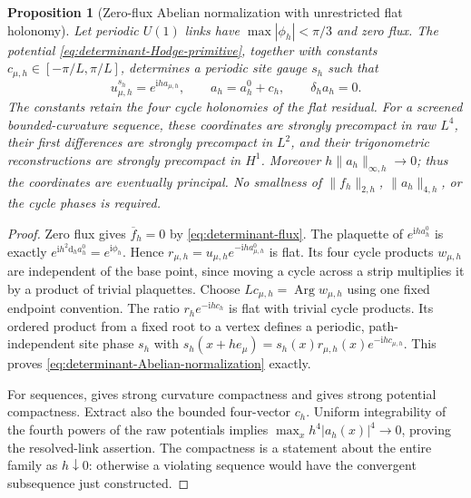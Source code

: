 \documentclass[11pt]{article}
\numberwithin{equation}{section}
\newtheorem{proposition}[proposition]{Proposition}
\theoremstyle{definition}
\theoremstyle{remark}
\newcommand{\dd}{\mathrm d}
\newcommand{\ii}{\mathrm i}
\newcommand{\norm}[1]{\lVert#1\rVert}
\begin{document}
\begin{proposition}[Zero-flux Abelian normalization with unrestricted flat holonomy]
\label{prop:periodic-determinant-normalization}
Let periodic $U(1)$ links have $\max|\phi_h|<\pi/3$ and zero flux.  The
potential \eqref{eq:determinant-Hodge-primitive}, together with constants
$c_{\mu,h}\in[-\pi/L,\pi/L]$, determines a periodic site gauge $s_h$ such
that
\begin{equation}
 u_{\mu,h}^{s_h}=e^{\ii h a_{\mu,h}},\qquad
 a_h=a_h^0+c_h,\qquad \delta_h a_h=0.
 \label{eq:determinant-Abelian-normalization}
\end{equation}
The constants retain the four cycle holonomies of the flat residual.
For a screened bounded-curvature sequence, these coordinates are strongly
precompact in raw $L^4$, their first differences are strongly precompact
in $L^2$, and their trigonometric reconstructions are strongly precompact
in $H^1$.  Moreover $h\norm{a_h}_{\infty,h}\to0$; thus the coordinates are
eventually principal.  No smallness of $\norm{f_h}_{2,h}$,
$\norm{a_h}_{4,h}$, or the cycle phases is required.
\end{proposition}
\begin{proof}
Zero flux gives $\overline f_h=0$ by \eqref{eq:determinant-flux}.  The
plaquette of $e^{\ii h a_h^0}$ is exactly
$e^{\ii h^2\dd_h a_h^0}=e^{\ii\phi_h}$.  Hence
$r_{\mu,h}=u_{\mu,h}e^{-\ii h a^0_{\mu,h}}$ is flat.  Its four cycle
products $w_{\mu,h}$ are independent of the base point, since moving a
cycle across a strip multiplies it by a product of trivial plaquettes.
Choose $Lc_{\mu,h}=\operatorname{Arg}w_{\mu,h}$ using one fixed endpoint
convention.  The ratio $r_he^{-\ii h c_h}$ is flat with trivial cycle
products.  Its ordered product from a fixed root to a vertex defines a
periodic, path-independent site phase $s_h$ with
$s_h(x+h e_\mu)=s_h(x)r_{\mu,h}(x)e^{-\ii h c_{\mu,h}}$.
This proves \eqref{eq:determinant-Abelian-normalization} exactly.

For sequences,  gives strong curvature
compactness and  gives strong
potential compactness.  Extract also the bounded four-vector $c_h$.
Uniform integrability of the fourth powers of the raw potentials implies
$\max_x h^4|a_h(x)|^4\to0$, proving the resolved-link assertion.  The
compactness is a statement about the entire family as $h\downarrow0$:
otherwise a violating sequence would have the convergent subsequence just
constructed.
\end{proof}
\end{document}

